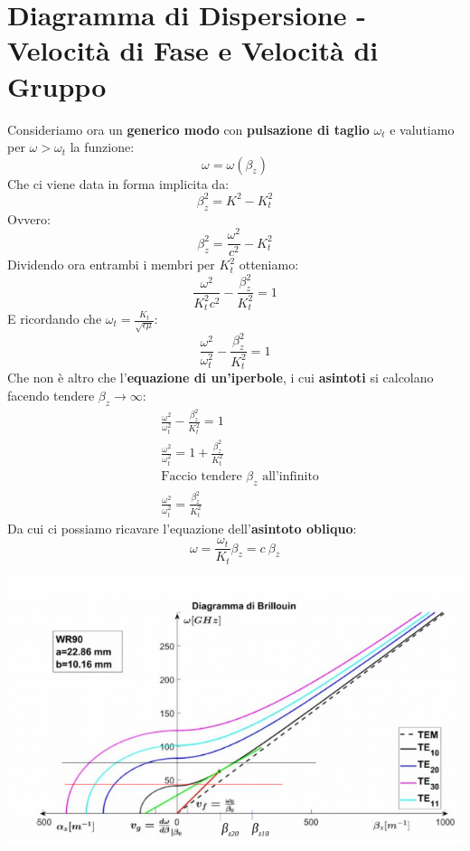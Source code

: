 \chapter{Diagramma di Dispersione - Velocità di Fase e Velocità di Gruppo}
Consideriamo ora un \textbf{generico modo} con \textbf{pulsazione di taglio} $\omega_t$ e valutiamo per $\omega > \omega_t$ la funzione:
\begin{equation*}
    \omega = \omega(\beta_z)
\end{equation*}
Che ci viene data in forma implicita da:
\begin{equation*}
    \beta^2_z = K^2 - K_t^2
\end{equation*}
Ovvero:
\begin{equation*}
    \beta^2_z = \frac{\omega^2}{c^2} - K_t^2
\end{equation*}
Dividendo ora entrambi i membri per $K^2_t$ otteniamo:
\begin{equation*}
    \frac{\omega^2}{K^2_t c^2}  - \frac{\beta^2_z}{K_t^2} = 1
\end{equation*}
E ricordando che $\omega_t = \frac{K_t}{\sqrt{\epsilon \mu}}$:
\begin{equation*}
    \frac{\omega^2}{\omega^2_t} - \frac{\beta^2_z}{K_t^2} = 1
\end{equation*}
Che non è altro che l'\textbf{equazione di un'iperbole}, i cui \textbf{asintoti} si calcolano facendo tendere $\beta_z \longrightarrow \infty$:
\begin{equation*}
\begin{aligned}
    &\frac{\omega^2}{\omega^2_t} - \frac{\beta^2_z}{K_t^2} = 1 \\
    &\frac{\omega^2}{\omega^2_t} = 1 + \frac{\beta^2_z}{K_t^2}\\
    &\text{Faccio tendere $\beta_z$ all'infinito}\\
    &\frac{\omega^2}{\omega^2_t} = \frac{\beta^2_z}{K_t^2}
\end{aligned}
\end{equation*}
Da cui ci possiamo ricavare l'equazione dell'\textbf{asintoto obliquo}:
\begin{equation*}
    \omega = \frac{\omega_t}{K_t} \beta_z = c \ \beta_z
\end{equation*}
\begin{center}
    \includegraphics[width=\textwidth]{Images/figure45.png}
\end{center}
